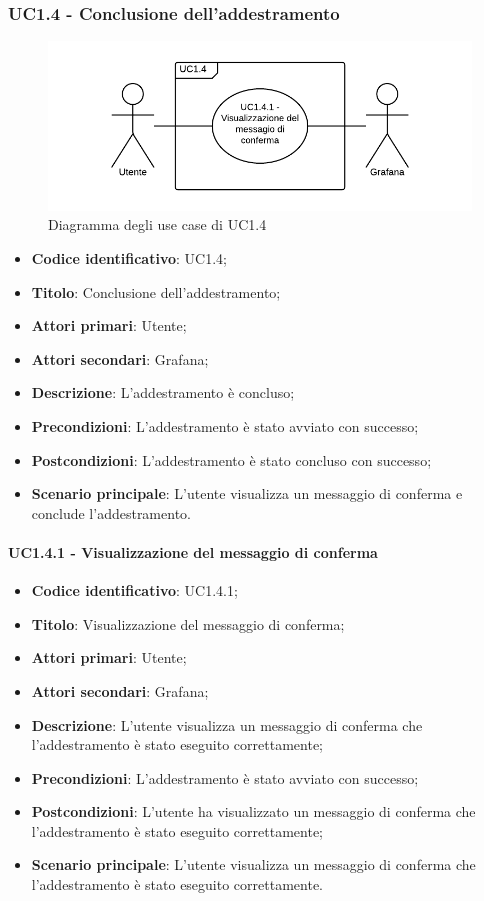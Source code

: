 \subsubsection{UC1.4 - Conclusione dell'addestramento}
\begin{figure}[H]
\includegraphics{img/UC1_4.png}
\caption{Diagramma degli use case di UC1.4}
\end{figure}
\begin{itemize}
	\item \textbf{Codice identificativo}: UC1.4;
	\item \textbf{Titolo}: Conclusione dell'addestramento;
	\item \textbf{Attori primari}: Utente;
	\item \textbf{Attori secondari}: Grafana\glo;
	\item \textbf{Descrizione}: L'addestramento è concluso;
	\item \textbf{Precondizioni}: L'addestramento è stato avviato con successo;
	\item \textbf{Postcondizioni}: L'addestramento è stato concluso con successo;
	\item \textbf{Scenario principale}: L'utente visualizza un messaggio di conferma e conclude l'addestramento.
\end{itemize}

\paragraph{UC1.4.1 - Visualizzazione del messaggio di conferma}
\begin{itemize}
	\item \textbf{Codice identificativo}: UC1.4.1;
	\item \textbf{Titolo}: Visualizzazione del messaggio di conferma;
	\item \textbf{Attori primari}: Utente;
	\item \textbf{Attori secondari}: Grafana\glo;
	\item \textbf{Descrizione}: L'utente visualizza un messaggio di conferma che l'addestramento è stato eseguito correttamente;
	\item \textbf{Precondizioni}: L'addestramento è stato avviato con successo;
	\item \textbf{Postcondizioni}: L'utente ha visualizzato un messaggio di conferma che l'addestramento è stato eseguito correttamente;
	\item \textbf{Scenario principale}: L'utente visualizza un messaggio di conferma che l'addestramento è stato eseguito correttamente.
\end{itemize}
